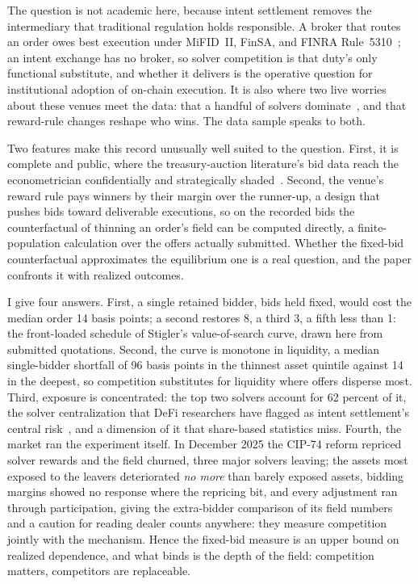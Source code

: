 \documentclass[11pt]{article}
\theoremstyle{plain}
\theoremstyle{definition}
\theoremstyle{remark}
\begin{document}
The question is not academic here, because intent settlement removes the intermediary that traditional regulation holds responsible. A broker that routes an order owes best execution under MiFID~II, FinSA, and FINRA Rule~5310~\citep{mifid2,finsa,finra5310}; an intent exchange has no broker, so solver competition is that duty's only functional substitute, and whether it delivers is the operative question for institutional adoption of on-chain execution. It is also where two live worries about these venues meet the data: that a handful of solvers dominate~\citep{chitra2024intent,zhang2026incentives}, and that reward-rule changes reshape who wins. The data sample speaks to both.

Two features make this record unusually well suited to the question. First, it is complete and public, where the treasury-auction literature's bid data reach the econometrician confidentially and strategically shaded~\citep{hortacsu2010mechanism,kastl2011discrete}. Second, the venue's reward rule pays winners by their margin over the runner-up, a design that pushes bids toward deliverable executions, so on the recorded bids the counterfactual of thinning an order's field can be computed directly, a finite-population calculation over the offers actually submitted. Whether the fixed-bid counterfactual approximates the equilibrium one is a real question, and the paper confronts it with realized outcomes.

I give four answers. First, a single retained bidder, bids held fixed, would cost the median order 14 basis points; a second restores 8, a third 3, a fifth less than 1: the front-loaded schedule of Stigler's value-of-search curve, drawn here from submitted quotations. Second, the curve is monotone in liquidity, a median single-bidder shortfall of 96 basis points in the thinnest asset quintile against 14 in the deepest, so competition substitutes for liquidity where offers disperse most. Third, exposure is concentrated: the top two solvers account for 62 percent of it, the solver centralization that DeFi researchers have flagged as intent settlement's central risk~\citep{chitra2024intent,zhang2026incentives}, and a dimension of it that share-based statistics miss. Fourth, the market ran the experiment itself. In December 2025 the CIP-74 reform repriced solver rewards and the field churned, three major solvers leaving; the assets most exposed to the leavers deteriorated \emph{no more} than barely exposed assets, bidding margins showed no response where the repricing bit, and every adjustment ran through participation, giving the extra-bidder comparison of \citet{bulow1996auctions} its field numbers and a caution for reading dealer counts anywhere: they measure competition jointly with the mechanism. Hence the fixed-bid measure is an upper bound on realized dependence, and what binds is the depth of the field: competition matters, competitors are replaceable.
\end{document}
